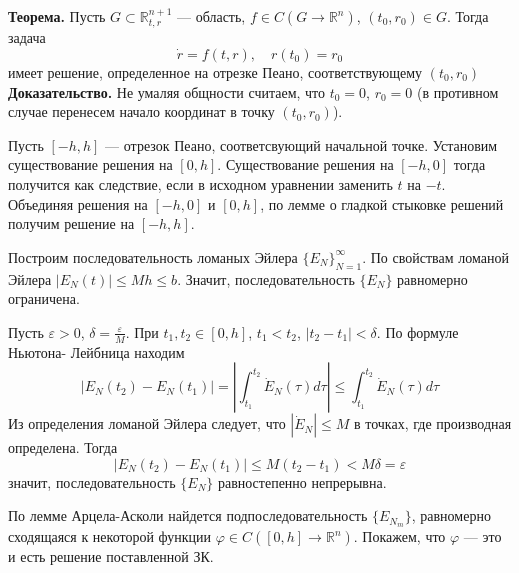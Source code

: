 \textbf{Теорема.} Пусть $G \subset \mathbb{R}_{t,r}^{n + 1}$ --- область, $f \in C(G \to \mathbb{R}^n)$, $(t_0, r_0) \in G$. Тогда задача
\begin{equation*}
    \dot{r} = f(t,r), \quad r(t_0) = r_0
\end{equation*}
имеет решение, определенное на отрезке Пеано, соответствующему $(t_0, r_0)$\\
\textbf{Доказательство.} Не умаляя общности считаем, что $t_0 = 0$, $r_0 = 0$ (в противном случае перенесем начало координат в точку $(t_0, r_0)$).

Пусть $[-h, h]$ --- отрезок Пеано, соответсвующий начальной точке. Установим существование решения на $[0, h]$. Существование решения на $[-h, 0]$ тогда получится как следствие, если в исходном уравнении заменить $t$ на $-t$. Объединяя решения на $[-h, 0]$ и $[0, h]$, по лемме о гладкой стыковке решений получим решение на $[-h, h]$.

Построим последовательность ломаных Эйлера $\{E_N\}_{N=1}^{\infty}$. По свойствам ломаной Эйлера $|E_N(t)| \le Mh \le b$. Значит, последовательность $\{E_N\}$ равномерно ограничена.

Пусть $\varepsilon > 0$, $\delta = \frac{\varepsilon}{M}$. При $t_1, t_2 \in [0, h]$, $t_1 < t_2$, $|t_2 - t_1| < \delta$. По формуле Ньютона- Лейбница находим
\begin{equation*}
    |E_N(t_2) - E_N(t_1)| = \left|\int_{t_1}^{t_2} \dot{E}_N(\tau)d\tau\right| \le \int_{t_1}^{t_2} \dot{E}_N(\tau)d\tau
\end{equation*}
Из определения ломаной Эйлера следует, что $|\dot{E}_N| \le M$ в точках, где производная определена. Тогда
\begin{equation*}
    |E_N(t_2) - E_N(t_1)| \le M(t_2 - t_1) < M\delta = \varepsilon
\end{equation*}
значит, последовательность $\{E_N\}$ равностепенно непрерывна.

По лемме Арцела-Асколи найдется подпоследовательность $\{E_{N_m}\}$, равномерно сходящаяся к некоторой функции $\varphi \in C([0,h] \to \mathbb{R}^n)$. Покажем, что $\varphi$ --- это и есть решение поставленной ЗК.

